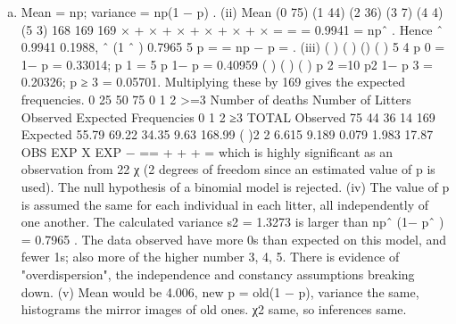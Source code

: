 \documentclass[a4paper,12pt]{article}
\begin{document}

\begin{enumerate}[(a)]
\item  Mean = np; variance = np(1 − p) .
(ii) Mean (0 75) (1 44) (2 36) (3 7) (4 4) (5 3) 168
169 169
× + × + × + × + × + ×
= =
= 0.9941 = npˆ .
Hence ˆ 0.9941 0.1988, ˆ (1 ˆ ) 0.7965
5
p = = np − p = .
(iii) ( ) ( ) () ( ) 5 4 p 0 = 1− p = 0.33014; p 1 = 5 p 1− p = 0.40959
( ) ( ) ( ) p 2 =10 p2 1− p 3 = 0.20326; p ≥ 3 = 0.05701.
Multiplying these by 169 gives the expected frequencies.
0
25
50
75
0 1 2 >=3
Number of deaths
Number of Litters
Observed
Expected
Frequencies 0 1 2 ≥3 TOTAL
Observed 75 44 36 14 169
Expected 55.79 69.22 34.35 9.63 168.99
( )2
2 6.615 9.189 0.079 1.983 17.87
OBS EXP
X
EXP
−
=\sigma = + + + = which is highly
significant as an observation from 22
χ (2 degrees of freedom since an estimated value
of p is used).
The null hypothesis of a binomial model is rejected.
(iv) The value of p is assumed the same for each individual in each litter, all
independently of one another. The calculated variance s2 = 1.3273 is larger than
npˆ (1− pˆ ) = 0.7965 . The data observed have more 0s than expected on this model,
and fewer 1s; also more of the higher number 3, 4, 5. There is evidence of
"overdispersion", the independence and constancy assumptions breaking down.
(v) Mean would be 4.006, new p = old(1 − p), variance the same, histograms the
mirror images of old ones. χ2 same, so inferences same.

\end{enumerate}
\end{document}
